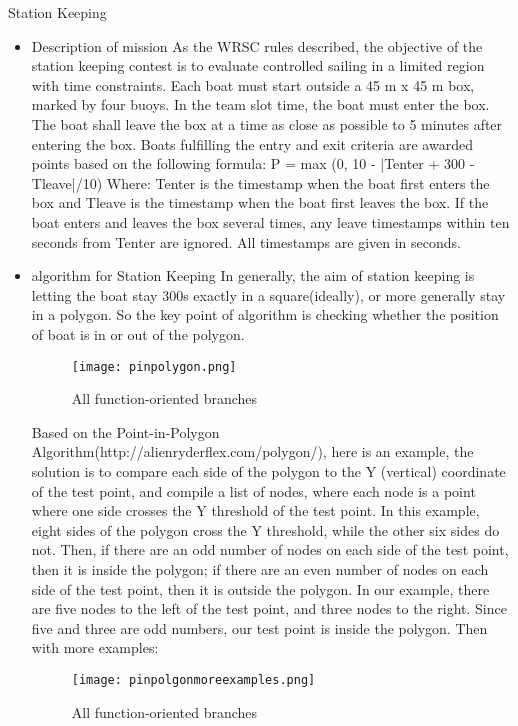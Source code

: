 \item{Station Keeping}
\begin{itemize}
\item{Description of mission}
As the WRSC rules described, the objective of the station keeping contest is to evaluate controlled sailing in a limited region with time constraints. Each boat must start outside a 45 m x 45 m box, marked by four buoys. In the team slot time, the boat must enter the box. The boat shall leave the box at a time as close as possible to 5 minutes after entering the box. Boats fulfilling the entry and exit criteria are awarded points based on the following formula:
P = max (0, 10 - |Tenter + 300 - Tleave|/10)
Where: Tenter is the timestamp when the boat first enters the box and Tleave is the timestamp
when the boat first leaves the box. If the boat enters and leaves the box several times, any leave timestamps within ten seconds from Tenter are ignored. All timestamps are given in seconds.
\item{algorithm for Station Keeping}
In generally, the aim of station keeping is letting the boat stay 300s exactly in a square(ideally), or more generally stay in a polygon. So the key point of algorithm is checking whether the position of boat is in or out of the polygon.
\begin{figure}[h!]
    \centering
    \texttt{[image: pinpolygon.png]}
    \caption{All function-oriented branches }
    \label{fig-sample}
\end{figure}
Based on the Point-in-Polygon Algorithm(http://alienryderflex.com/polygon/), here is an example, the solution is to compare each side of the polygon to the Y (vertical) coordinate of the test point, and compile a list of nodes, where each node is a point where one side crosses the Y threshold of the test point. In this example, eight sides of the polygon cross the Y threshold, while the other six sides do not. Then, if there are an odd number of nodes on each side of the test point, then it is inside the polygon; if there are an even number of nodes on each side of the test point, then it is outside the polygon. In our example, there are five nodes to the left of the test point, and three nodes to the right. Since five and three are odd numbers, our test point is inside the polygon.
Then with more examples:
\begin{figure}[h!]
    \centering
    \texttt{[image: pinpolgonmoreexamples.png]}
    \caption{All function-oriented branches }
    \label{fig-sample}
\end{figure}

\end{itemize}